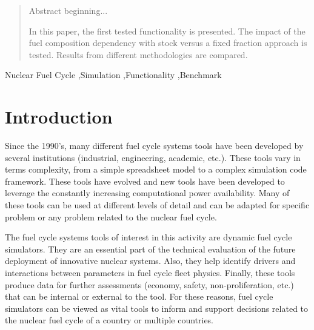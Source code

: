 \documentclass[review]{elsarticle}
\begin{document}
\begin{frontmatter}
\begin{abstract}
Abstract beginning...


In this paper, the first tested functionality is presented. The impact of the fuel composition dependency with stock versus a fixed fraction approach is tested. Results from different methodologies are compared.
\end{abstract}

\begin{keyword}
Nuclear Fuel Cycle \sep Simulation \sep Functionality \sep Benchmark
\end{keyword}

\end{frontmatter}

\linenumbers

\section{Introduction}

Since the 1990’s, many different fuel cycle systems tools have been developed by several institutions (industrial, engineering, academic, etc.). These tools vary in terms complexity, from a simple spreadsheet model to a complex simulation code framework. These tools have evolved and new tools have been developed to leverage the constantly increasing computational power availability. Many of these tools can be used at different levels of detail and can be adapted for specific problem or any problem related to the nuclear fuel cycle.

The fuel cycle systems tools of interest in this activity are dynamic fuel cycle simulators. They are an essential part of the technical evaluation of the future deployment of innovative nuclear systems. Also, they help identify drivers and interactions between parameters in fuel cycle fleet physics. Finally, these tools produce data for further assessments (economy, safety, non-proliferation, etc.) that can be internal or external to the tool. For these reasons, fuel cycle simulators can be viewed as vital tools to inform and support decisions related to the nuclear fuel cycle of a country or multiple countries.
\end{document}
